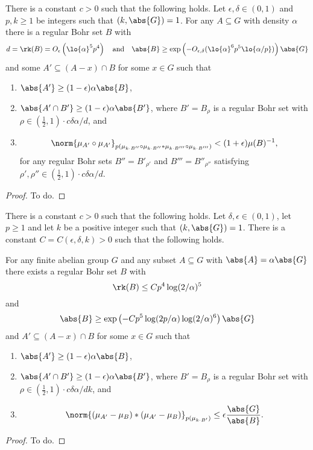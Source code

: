 \begin{theorem}\label{flat-on-bohr}
There is a constant $c>0$ such that the following holds. Let ${\epsilon,\delta\in (0,1)}$ and $p,k\geq 1$ be integers such that $(k,\abs{G})=1$. For any $A\subseteq G$ with density $\alpha$ there is a regular Bohr set $B$ with
\[ d=\rk(B) =O_{\epsilon}\left(\lo{\alpha}^5p^4\right) \quad\text{and}\quad \abs{B}\geq \exp\left(-O_{\epsilon,\delta}(\lo{\alpha}^6p^5\lo{\alpha/p})\right)\abs{G} \]
and some $A'\subseteq (A-x)\cap B$ for some $x \in G$ such that 
\begin{enumerate}
\item $\abs{A'}\geq (1-\epsilon)\alpha\abs{B}$,
\item $\abs{A'\cap B'}\geq (1-\epsilon)\alpha\abs{B'}$, where $B'=B_{\rho}$ is a regular Bohr set with ${\rho\in (\tfrac{1}{2},1)\cdot c\delta\alpha/d}$, and 
\item
\[\norm{\mu_{A'}\circ \mu_{A'}}_{p(\mu_{k\cdot B''}\circ \mu_{k\cdot B''}\ast \mu_{k\cdot B'''}\circ \mu_{k\cdot B'''})} <(1+ \epsilon)\mu(B)^{-1},\]
for any regular Bohr sets $B'' = B'_{\rho'}$ and $B'''=B''_{\rho''}$ satisfying ${\rho',\rho''\in(\frac{1}{2},1)\cdot c\delta\alpha/d}$.
\end{enumerate}
\end{theorem}
\begin{proof}
To do. 
\end{proof}

\begin{theorem}\label{th-int-gen}
There is a constant $c>0$ such that the following holds. Let $\delta,\epsilon\in (0,1)$, let $p \geq 1$ and let $k$ be a positive integer such that $(k,\abs{G})=1$. There is a constant $C=C(\epsilon,\delta,k)>0$ such that the following holds.

For any finite abelian group $G$ and any subset $A\subseteq G$ with $\abs{A}=\alpha \abs{G}$ there exists a regular Bohr set $B$ with
\[\rk(B)\leq Cp^4\log(2/\alpha)^5\]
and
\[\abs{B}\geq \exp\left(-Cp^5\log(2p/\alpha)\log(2/\alpha)^6\right)\abs{G}\]
and $A' \subseteq (A-x)\cap B$ for some $x\in G$ such that
\begin{enumerate}
\item $\abs{A'}\geq (1-\epsilon)\alpha \abs{B}$,
\item $\abs{A'\cap B'}\geq (1-\epsilon)\alpha\abs{B'}$, where $B'=B_{\rho}$ is a regular Bohr set with $\rho\in (\tfrac{1}{2},1)\cdot c\delta\alpha/dk$, and 
\item
\[\norm{(\mu_{A'}-\mu_B)\ast (\mu_{A'}- \mu_B)}_{p(\mu_{k\cdot B'})} \leq \epsilon\frac{\abs{G}}{\abs{B}}.\]
\end{enumerate}
\end{theorem}
\begin{proof}
To do. \end{proof}

